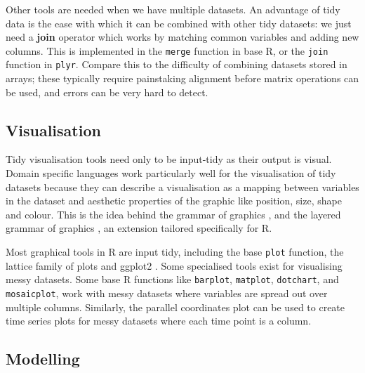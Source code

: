 \documentclass[article]{jss}
\begin{document}

Other tools are needed when we have multiple datasets. An advantage of tidy data is the ease with which it can be combined with other tidy datasets: we just need a {\bf join} operator which works by matching common variables and adding new columns. This is implemented in the {\tt merge} function in base R, or the {\tt join} function in {\tt plyr}. Compare this to the difficulty of combining datasets stored in arrays; these typically require painstaking alignment before matrix operations can be used, and errors can be very hard to detect.

\subsection{Visualisation}

Tidy visualisation tools need only to be input-tidy as their output is visual. Domain specific languages work particularly well for the visualisation of tidy datasets because they can describe a visualisation as a mapping between variables in the dataset and aesthetic properties of the graphic like position, size, shape and colour. This is the idea behind the grammar of graphics \citep{wilkinson:2006}, and the layered grammar of graphics \citep{wickham:2007d}, an extension tailored specifically for R.

Most graphical tools in R are input tidy, including the base {\tt plot} function, the lattice family of plots \citep{sarkar:2008} and ggplot2 \citep{me:ggplot2}. Some specialised tools exist for visualising messy datasets. Some base R functions like {\tt barplot}, {\tt matplot}, {\tt dotchart}, and {\tt mosaicplot}, work with messy datasets where variables are spread out over multiple columns. Similarly, the parallel coordinates plot \citep{wegman:1990,inselberg:1985} can be used to create time series plots for messy datasets where each time point is a column.

\subsection{Modelling}
\label{sub:modelling}
\end{document}
